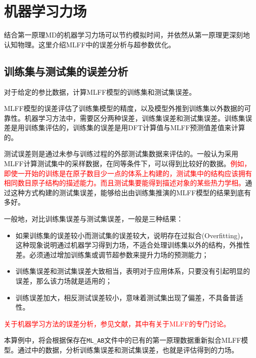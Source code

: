 \section{机器学习力场}
结合第一原理\textrm{MD}的机器学习力场可以节约模拟时间，并依然从第一原理更深刻地认知物理。这里介绍\textrm{MLFF}中的误差分析与超参数优化。

\subsection{训练集与测试集的误差分析}
对于给定的参比数据，计算\textrm{MLFF}模型的训练集和测试集误差。

\textrm{MLFF}模型的误差评估了训练集模型的精度，以及模型外推到训练集以外数据的可靠性。机器学习方法中，需要区分两种误差，训练集误差和测试集误差。训练集误差是用训练集评估的，训练集的误差是用\textrm{DFT}计算值与\textrm{MLFF}预测值差值来计算的。

测试误差则是通过未参与训练过程的外部测试集数据来评估的。一般认为采用\textrm{MLFF}计算测试集中的采样数据，在同等条件下，可以得到比较好的数据。\textcolor{red}{例如，即使一开始的训练是在原子数目少一点的体系上构建的，测试集中的结构应该拥有相同数目原子结构的描述能力。而且测试集要能得到描述对象的某些热力学相。}通过这种方式构建的测试集误差，能够给出由训练集推演的\textrm{MLFF}模型的结果到底有多好。

一般地，对比训练集误差与测试集误差，一般是三种结果：
\begin{itemize}
	\item 如果训练集的误差较小而测试集的误差较大，说明存在过拟合\textrm{(Overfitting)}，这种现象说明通过机器学习得到力场，不适合处理训练集以外的结构，外推性差。必须通过增加训练集或调节超参数来提升力场的预测能力；
	\item 训练集误差和测试集误差大致相当，表明对于应用体系，只要没有引起明显的误差，那么该力场就是适用的；
	\item 训练误差加大，相反测试误差较小，意味着测试集出现了偏差，不具备普适性。
\end{itemize}
\textcolor{red}{关于机器学习方法的误差分析，参见文献\cite{DOI:10.1063/5.0160326}，其中有关于\textrm{MLFF}的专门讨论。}

本算例中，将会根据保存在\texttt{ML\_AB}文件中的已有的第一原理数据重新拟合\textrm{MLFF}模型。通过中的数据，分析训练集误差和测试集误差，也就是评估得到的力场。



